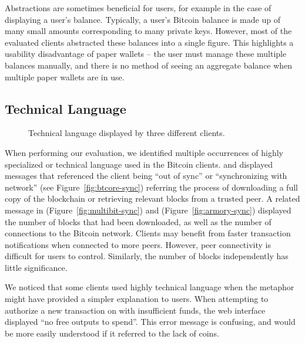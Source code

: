 Abstractions are sometimes beneficial for users, for example in the case of displaying a user's balance. Typically, a user's Bitcoin balance is made up of many small amounts corresponding to many private keys. However, most of the evaluated clients abstracted these balances into a single figure. This highlights a usability disadvantage of paper wallets -- the user must manage these multiple balances manually, and there is no method of seeing an aggregate balance when multiple paper wallets are in use.

\subsection{Technical Language}
\begin{figure}[htb]
        \centering
                
        
        \caption{Technical language displayed by three different clients. }\label{fig:techlang}
\end{figure}
%
When performing our evaluation, we identified multiple occurrences of highly specialized or technical language used in the Bitcoin clients. \multibit and  \bitcoinclient displayed messages that referenced the client being ``out of sync'' or ``synchronizing with network'' (see Figure~\ref{fig:btcore-sync}) referring the process of downloading a full copy of the blockchain or retrieving relevant blocks from a trusted peer. A related message in \multibit (Figure~\ref{fig:multibit-sync}) and \armory (Figure~\ref{fig:armory-sync}) displayed the number of blocks that had been downloaded, as well as the number of connections to the Bitcoin network. Clients may benefit from faster transaction notifications when connected to more peers. However, peer connectivity is difficult for users to control. Similarly, the number of blocks independently has little significance.

We noticed that some clients used highly technical language when the metaphor might have provided a simpler explanation to users. When attempting to authorize a new transaction on \block with insufficient funds, the web interface displayed ``no free outputs to spend''. This error message is confusing, and would be more easily understood if it referred to the lack of coins. 

